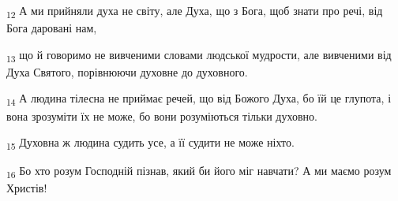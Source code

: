 \begin{tcolorbox}
\textsubscript{12} А ми прийняли духа не світу, але Духа, що з Бога, щоб знати про речі, від Бога даровані нам,
\end{tcolorbox}
\begin{tcolorbox}
\textsubscript{13} що й говоримо не вивченими словами людської мудрости, але вивченими від Духа Святого, порівнюючи духовне до духовного.
\end{tcolorbox}
\begin{tcolorbox}
\textsubscript{14} А людина тілесна не приймає речей, що від Божого Духа, бо їй це глупота, і вона зрозуміти їх не може, бо вони розуміються тільки духовно.
\end{tcolorbox}
\begin{tcolorbox}
\textsubscript{15} Духовна ж людина судить усе, а її судити не може ніхто.
\end{tcolorbox}
\begin{tcolorbox}
\textsubscript{16} Бо хто розум Господній пізнав, який би його міг навчати? А ми маємо розум Христів!
\end{tcolorbox}
